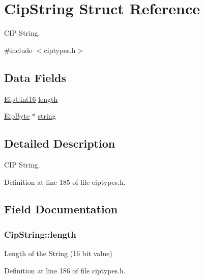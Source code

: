 \hypertarget{structCipString}{\section{\-Cip\-String \-Struct \-Reference}
\label{df/d66/structCipString}
}


\-C\-I\-P \-String.  




{\ttfamily \#include $<$ciptypes.\-h$>$}

\subsection*{\-Data \-Fields}
\begin{DoxyCompactItemize}
\item 
\hyperlink{typedefs_8h_ac1b4cfa25b4f5def62f23b455dd395d8}{\-Eip\-Uint16} \hyperlink{structCipString_a15752788e5cd26c6c01f92b4ecceaf22}{length}
\item 
\hyperlink{typedefs_8h_a168bac8db7e7e6d944700e1ac4717ae3}{\-Eip\-Byte} $\ast$ \hyperlink{structCipString_a5e952aabbdf886a82f194f9e8a3908b1}{string}
\end{DoxyCompactItemize}


\subsection{\-Detailed \-Description}
\-C\-I\-P \-String. 



\-Definition at line 185 of file ciptypes.\-h.



\subsection{\-Field \-Documentation}
\hypertarget{structCipString_a15752788e5cd26c6c01f92b4ecceaf22}{
\subsubsection[{length}]{ {\bf \-Cip\-String\-::length}}}\label{df/d66/structCipString_a15752788e5cd26c6c01f92b4ecceaf22}
\-Length of the \-String (16 bit value) 

\-Definition at line 186 of file ciptypes.\-h.



